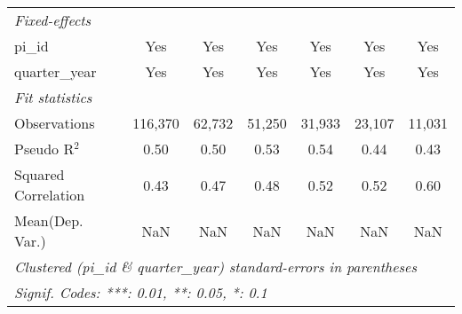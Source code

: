 \begin{tabular}{lcccccc}
   \midrule
   \emph{Fixed-effects}\\
   pi\_id                                                     & Yes            & Yes           & Yes            & Yes            & Yes           & Yes\\  
   quarter\_year                                              & Yes            & Yes           & Yes            & Yes            & Yes           & Yes\\  
   \midrule
   \emph{Fit statistics}\\
   Observations                                               & 116,370        & 62,732        & 51,250         & 31,933         & 23,107        & 11,031\\  
   Pseudo R$^2$                                               & 0.50           & 0.50          & 0.53           & 0.54           & 0.44          & 0.43\\  
   Squared Correlation                                        & 0.43           & 0.47          & 0.48           & 0.52           & 0.52          & 0.60\\  
Mean(Dep. Var.) & NaN & NaN & NaN & NaN & NaN & NaN \\
   \midrule \midrule
   \multicolumn{7}{l}{\emph{Clustered (pi\_id \& quarter\_year) standard-errors in parentheses}}\\
   \multicolumn{7}{l}{\emph{Signif. Codes: ***: 0.01, **: 0.05, *: 0.1}}\\
\end{tabular}
\par\endgroup
